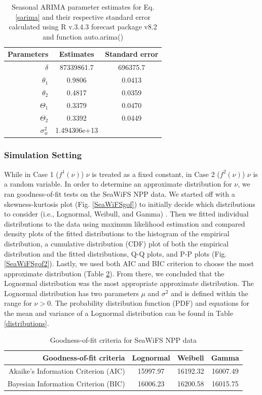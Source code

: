 \documentclass[oneside,12pt,final]{sty/ucthesis-CA2012}
\let\cite\citep                             %
\begin{document}
\begin{mainmatter}
\begin{table}[H]
\centering
\caption{Seasonal ARIMA parameter estimates for Eq. \ref{sarima} and their respective standard error calculated using R v.3.4.3 \cite{Rcite} forecast package v8.2 and function auto.arima() \cite{forecast1, forecast2} }
\begin{tabular}{r|c|c}
  \hline \small
 Parameters & Estimates & Standard error \\ 
   \hline
   $\delta$ & 87339861.7 & 696375.7 \\   
   $\theta_1$ & 0.9806 & 0.0413 \\
   $\theta_2$ & 0.4817 & 0.0359 \\
   $\Theta_1$ & 0.3379 & 0.0470 \\
   $\Theta_2$ & 0.3392 & 0.0449 \\
   $\sigma_w^2$ & 1.494306e+13 & \\
   \hline
\end{tabular} 
\label{sarima_parameters}
\end{table}

\subsubsection{Simulation Setting}
While in Case 1 ($f^1(\nu)$) $\nu$ is treated as a fixed constant, in Case 2 ($f^2(\nu)$) $\nu$ is a random variable. In order to determine an approximate distribution for $\nu$, we ran goodness-of-fit tests on the SeaWiFS NPP data. We started off with a skewness-kurtosis plot (Fig. \ref{SeaWiFSgof}) to initially decide which distributions to consider (i.e., Lognormal, Weibull, and Gamma) \cite{fitdistrplus}. Then we fitted individual distributions to the data using maximum likelihood estimation and compared density plots of the fitted distributions to the histogram of the empirical distribution, a cumulative distribution (CDF) plot of both the empirical distribution and the fitted distributions, Q-Q plots, and P-P plots (Fig. \ref{SeaWiFSgof2}). Lastly, we used both AIC and BIC criterion to choose the most approximate distribution (Table \ref{seawifs_aic}). From there, we concluded that the Lognormal distribution was the most appropriate approximate distribution. The Lognormal distribution has two parameters $\mu$ and $\sigma^2$ and is defined within the range for $\nu > 0$. The probability distribution function (PDF) and equations for the mean and variance of a Lognormal distribution can be found in Table \ref{distributions}.

\begin{table}[H]
\centering
\caption{Goodness-of-fit criteria for SeaWiFS NPP data}
\begin{tabular}{r|c|c|c}
  \hline \small
 Goodness-of-fit criteria & Lognormal & Weibell & Gamma \\ 
   \hline
   Akaike's Information Criterion (AIC) & 15997.97 & 16192.32 & 16007.49 \\   
   Bayesian Information Criterion (BIC) & 16006.23 & 16200.58 & 16015.75 \\
   \hline
\end{tabular} 
\label{seawifs_aic}
\end{table}


\end{mainmatter}
\end{document}

